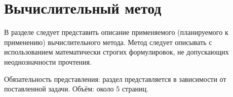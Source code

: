\chapter{Вычислительный метод}\label{chap2_comp_method}

В разделе следует представить описание применяемого (планируемого к применению) вычислительного метода. Метод следует описывать с использованием математически строгих формулировок, не допускающих неоднозначности прочтения.

Обязательность представления: раздел представляется в зависимости от поставленной задачи.
Объём: около 5 страниц.


